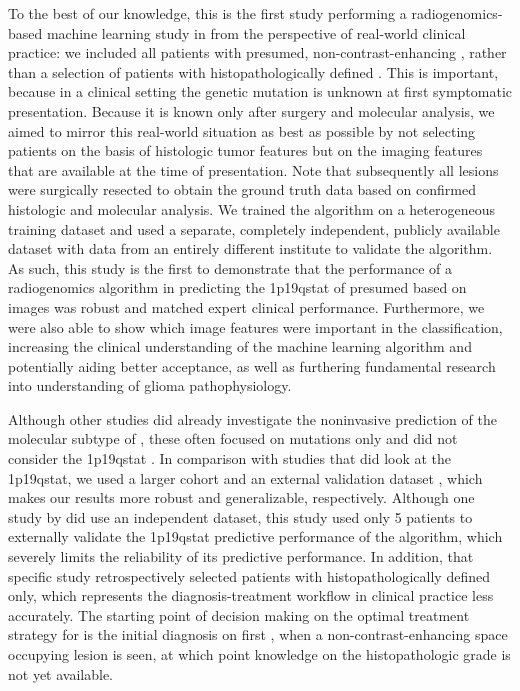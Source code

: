 To the best of our knowledge, this is the first study performing a radiogenomics-based machine learning study in  from the perspective of real-world clinical practice: we included all patients with presumed, non-contrast-enhancing , rather than a selection of patients with histopathologically defined .
This is important, because in a clinical setting the genetic mutation is unknown at first symptomatic presentation.
Because it is known only after surgery and molecular analysis, we aimed to mirror this real-world situation as best as possible by not selecting patients on the basis of histologic tumor features but on the imaging features that are available at the time of presentation.
Note that subsequently all lesions were surgically resected to obtain the ground truth data based on confirmed histologic and molecular analysis.
We trained the algorithm on a heterogeneous training dataset and used a separate, completely independent, publicly available dataset with data from an entirely different institute to validate the algorithm.
As such, this study is the first to demonstrate that the performance of a radiogenomics algorithm in predicting the \acl{1p19qstat} of presumed  based on  images was robust and matched expert clinical performance.
Furthermore, we were also able to show which image features were important in the classification, increasing the clinical understanding of the machine learning algorithm and potentially aiding better acceptance, as well as furthering fundamental research into understanding of glioma pathophysiology.

Although other studies did already investigate the noninvasive prediction of the molecular subtype of , these often focused on  mutations only and did not consider the \acl{1p19qstat} \autocite{li2017deep, ren2019noninvasive, yu2017noninvasive}.
In comparison with studies that did look at the \acl{1p19qstat}, we used a larger cohort and an external validation dataset \autocite{akkus2017predicting, chang2018deep, han2018non, park2018prediction, shofty2018mri}, which makes our results more robust and generalizable, respectively.
Although one study by  did use an independent dataset, this study used only 5 patients to externally validate the \acl{1p19qstat} predictive performance of the algorithm, which severely limits the reliability of its predictive performance.
In addition, that specific study retrospectively selected patients with histopathologically defined  only, which represents the diagnosis-treatment workflow in clinical practice less accurately.
The starting point of decision making on the optimal treatment strategy for  is the initial diagnosis on first , when a non-contrast-enhancing space occupying lesion is seen, at which point knowledge on the histopathologic grade is not yet available.


